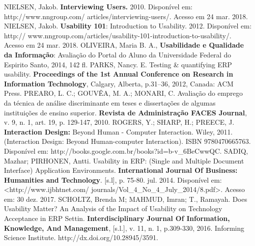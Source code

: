 \newline
\newline
\noindent
NIELSEN, Jakob.  \textbf{Interviewing Users.} 2010. Disponível em: http://www.nngroup.com/ articles/interviewing-users/. Acesso em 24 mar. 2018.
\newline
\newline
\noindent
NIELSEN, Jakob. \textbf{Usability 101}: Introduction to Usability. 2012. Disponível em:
http://
www.nngroup.com/articles/usability-101-introduction-to-usability/. Acesso em
24 mar. 2018.
\newline
\newline
\noindent
OLIVEIRA, Maria B. A., \textbf{Usabilidade e Qualidade da Informação}: Avaliação do Portal do Aluno da Universidade Federal do Espirito Santo, 2014, 142 fl.
\newline
\newline
\noindent
PARKS, Nancy. E. Testing \& quantifying ERP usability. \textbf{Proceedings of the 1st Annual Conference on Research in Information Technology}, Calgary, Alberta, p.31–36, 2012, Canada: ACM Press.
\newline
\newline
\noindent
PREARO, L. C.; GOUVÊA, M. A.; MONARI, C. Avaliação do emprego da técnica de análise discriminante em teses e dissertações de algumas instituições de ensino superior. \textbf{Revista de Administração FACES Journal}, v. 9, n. 1, art. 19, p. 129-147, 2010.
\newline
\newline
\noindent
ROGERS, Y.; SHARP, H.; PREECE, J. \textbf{Interaction Design:} Beyond Human - Computer Interaction. Wiley, 2011. (Interaction Design: Beyond Human-computer Interaction). ISBN 9780470665763. Disponível em:
http://books.google.com.br/books?id=b-v\_6BeCwwQC.
\newline
\newline
\noindent
SADIQ, Mazhar; PIRHONEN, Antti. Usability in ERP: (Single and Multiple Document Interface) Application Environments. \textbf{International Journal Of Business: Humanities and Technology}. [s.l], p. 75-80. jul. 2014. Disponível em: <http://www.ijbhtnet.com/
journals/Vol\_4\_No\_4\_July\_2014/8.pdf>. Acesso em: 30 dez. 2017.
\newline
\newline
\noindent
SCHOLTZ, Brenda M; MAHMUD, Imran; T., Ramayah. Does Usability Matter? An Analysis of the Impact of Usability on Technology Acceptance in ERP Settin. \textbf{Interdisciplinary Journal Of Information, Knowledge, And Management}, [s.l.], v. 11, n. 1, p.309-330, 2016. Informing Science Institute. http://dx.doi.org/10.28945/3591.
